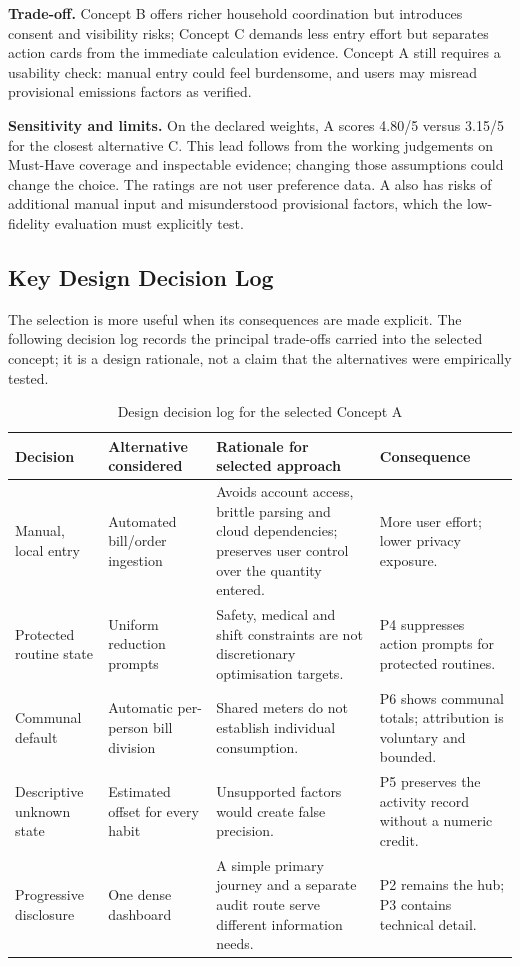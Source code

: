 \documentclass[12pt,a4paper]{article}
\begin{document}
\textbf{Trade-off.} Concept B offers richer household coordination but introduces consent and visibility risks; Concept C demands less entry effort but separates action cards from the immediate calculation evidence. Concept A still requires a usability check: manual entry could feel burdensome, and users may misread provisional emissions factors as verified.

\textbf{Sensitivity and limits.} On the declared weights, A scores 4.80/5 versus 3.15/5 for the closest alternative C. This lead follows from the working judgements on Must-Have coverage and inspectable evidence; changing those assumptions could change the choice. The ratings are not user preference data. A also has risks of additional manual input and misunderstood provisional factors, which the low-fidelity evaluation must explicitly test.

\subsection{Key Design Decision Log}
The selection is more useful when its consequences are made explicit. The following decision log records the principal trade-offs carried into the selected concept; it is a design rationale, not a claim that the alternatives were empirically tested.

\begin{table}[ht]
\centering
\small
\caption{Design decision log for the selected Concept A}
\label{tab:decision-log}
\begin{tabularx}{\textwidth}{|>{\raggedright\arraybackslash}p{2.45cm}|>{\raggedright\arraybackslash}p{3.0cm}|>{\raggedright\arraybackslash}X|>{\raggedright\arraybackslash}p{2.5cm}|}
\toprule
\textbf{Decision} & \textbf{Alternative considered} & \textbf{Rationale for selected approach} & \textbf{Consequence}\\
\midrule
Manual, local entry & Automated bill/order ingestion & Avoids account access, brittle parsing and cloud dependencies; preserves user control over the quantity entered. & More user effort; lower privacy exposure.\\
\rowcolor{brandlight}
Protected routine state & Uniform reduction prompts & Safety, medical and shift constraints are not discretionary optimisation targets. & P4 suppresses action prompts for protected routines.\\
Communal default & Automatic per-person bill division & Shared meters do not establish individual consumption. & P6 shows communal totals; attribution is voluntary and bounded.\\
\rowcolor{brandlight}
Descriptive unknown state & Estimated offset for every habit & Unsupported factors would create false precision. & P5 preserves the activity record without a numeric credit.\\
Progressive disclosure & One dense dashboard & A simple primary journey and a separate audit route serve different information needs. & P2 remains the hub; P3 contains technical detail.\\
\bottomrule
\end{tabularx}
\end{table}
\end{document}
